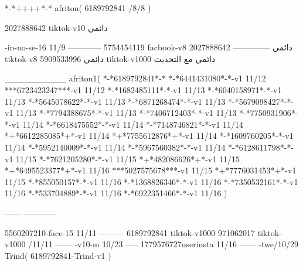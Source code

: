 *-*++++*-*
afriton(
6189792841 /8/8
)

2027888642 tiktok-v10
دائمي

-in-no-se-16 11/9
------------
5754454119 facbook-v8
دائمي
--------------
2027888642 tiktok-v8
دائمي
5909533996 tiktok-v1000
دائمي مع التحديث

__________
afriton1(
*-*6189792841*-*
*-*6441431080*-*-v1 11/12
***6723423247***-v1 11/12
*-*1682485111*-*-v1 11/13
*-*6040158971*-*-v1 11/13
*-*5645078622*-*-v1 11/13
*-*6871268474*-*-v1 11/13
*-*5679098427*-*-v1 11/13
*-*7794388675*-*-v1 11/13
*-*7406712403*-*-v1 11/13
*-*7750931906*-*-v1 11/14
*-*6618475552*-*-v1 11/14
*-*7148746821*-*-v1 11/14
*+*6612285085*+*-v1 11/14
*+*7755612876*+*-v1 11/14
*-*1609760205*-*-v1 11/14
*-*5952140009*-*-v1 11/14
*-*5967560382*-*-v1 11/14
*-*6128611798*-*-v1 11/15
*-*7621205280*-*-v1 11/15
*+*482086626*+*-v1 11/15
*+*6495523377*+*-v1 11/16
***5027575678***-v1 11/15
*+*7776031453*+*-v1 11/15
*-*855050157*-*-v1 11/16
*-*1368826346*-*-v1 11/16
*-*7350532161*-*-v1 11/16
*-*533704889*-*-v1 11/16
*-*6922351466*-*-v1 11/16
)

------
------------

5560207210-face-15 11/11
---------
6189792841 tiktok-v1000
971062017 tiktok-v1000 /11/11
------
-v10-m 10/23
-----
1779576727userinsta 11/16
------
-twe/10/29
Trind(
6189792841-Trind-v1 
)
